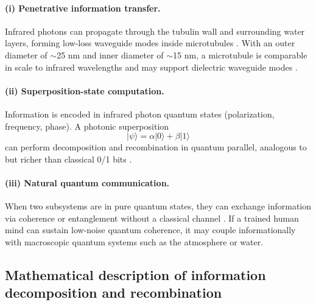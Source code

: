 \documentclass[11pt,a4paper]{article}
\begin{document}
\paragraph{(i) Penetrative information transfer.} Infrared photons can propagate through the tubulin wall and surrounding water layers, forming low-loss waveguide modes inside microtubules \cite{Pokorny2004}. With an outer diameter of $\sim$25 nm and inner diameter of $\sim$15 nm, a microtubule is comparable in scale to infrared wavelengths and may support dielectric waveguide modes \cite{Craddock2018,Pokorny2004}.

\paragraph{(ii) Superposition-state computation.} Information is encoded in infrared photon quantum states (polarization, frequency, phase). A photonic superposition
\begin{equation}
|\psi\rangle = \alpha|0\rangle + \beta|1\rangle
\end{equation}
can perform decomposition and recombination in quantum parallel, analogous to but richer than classical 0/1 bits \cite{Nielsen2010,Engel2007}.

\paragraph{(iii) Natural quantum communication.} When two subsystems are in pure quantum states, they can exchange information via coherence or entanglement without a classical channel \cite{Vedral2011}. If a trained human mind can sustain low-noise quantum coherence, it may couple informationally with macroscopic quantum systems such as the atmosphere or water.

\subsection{Mathematical description of information decomposition and recombination}
\end{document}
